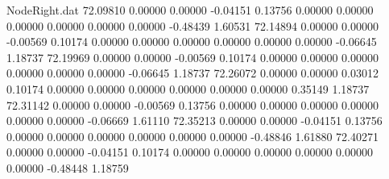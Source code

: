 \begin{filecontents}{NodeRight.dat}
  72.09810    0.00000    0.00000    -0.04151    0.13756    0.00000    0.00000    0.00000    0.00000    0.00000    0.00000   -0.48439    1.60531
  72.14894    0.00000    0.00000    -0.00569    0.10174    0.00000    0.00000    0.00000    0.00000    0.00000    0.00000   -0.06645    1.18737
  72.19969    0.00000    0.00000    -0.00569    0.10174    0.00000    0.00000    0.00000    0.00000    0.00000    0.00000   -0.06645    1.18737
  72.26072    0.00000    0.00000     0.03012    0.10174    0.00000    0.00000    0.00000    0.00000    0.00000    0.00000    0.35149    1.18737
  72.31142    0.00000    0.00000    -0.00569    0.13756    0.00000    0.00000    0.00000    0.00000    0.00000    0.00000   -0.06669    1.61110
  72.35213    0.00000    0.00000    -0.04151    0.13756    0.00000    0.00000    0.00000    0.00000    0.00000    0.00000   -0.48846    1.61880
  72.40271    0.00000    0.00000    -0.04151    0.10174    0.00000    0.00000    0.00000    0.00000    0.00000    0.00000   -0.48448    1.18759
\end{filecontents}
